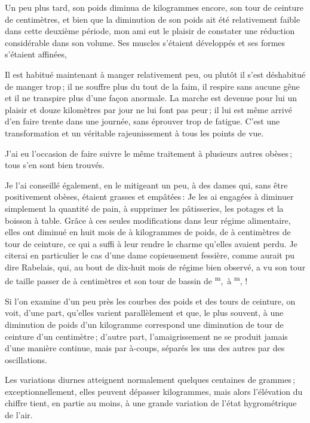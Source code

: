 Un peu plus tard, son poids diminua de {\mmm} kilogrammes encore, son tour
de ceinture de {\mmm} centimètres, et bien que la diminution de son poids
ait été relativement faible dans cette deuxième période, mon ami eut le plaisir
de constater une réduction considérable dans son volume. Ses muscles s'étaient
développés et ses formes s'étaient affinées,

Il est habitué maintenant à manger relativement peu, ou plutôt il s'est
déshabitué de manger trop ; il ne souffre plus du tout de la faim, il respire
sans aucune gêne et il ne transpire plus d'une façon anormale. La marche est
devenue pour lui un plaisir et douze kilomètres par jour ne lui font pas peur ;
il lui est même arrivé d'en faire trente dans une journée, sans éprouver trop
de fatigue. C'est une transformation et un véritable rajeunissement à tous les
points de vue.

J'ai eu l’occasion de faire suivre le même traitement à plusieurs autres obèses ;
tous s'en sont bien trouvés.

Je l'ai conseillé également, en le mitigeant un peu, à des dames qui, sans être
positivement obèses, étaient grasses et empâtées : Je les ai engagées
à diminuer simplement la quantité de pain, à supprimer les pâtisseries, les
potages et la boisson à table. Grâce à ces seules modifications dans leur
régime alimentaire, elles ont diminué en huit mois de {\mmm}
à {\mmm} kilogrammes de poids, de {\mmm} à {\mmm} centimètres
de tour de ceinture, ce qui a suffi à leur rendre le charme qu'elles avaient
perdu. Je citerai en particulier le cas d'une dame copieusement fessière, comme
aurait pu dire Rabelais, qui, au bout de dix-huit mois de régime bien observé,
a vu son tour de taille passer de {\mmm} à {\mmm} centimètres et
son tour de bassin de {\mmm}\textsuperscript{m}, {\mmm}
à {\mmm}\textsuperscript{m}, {\mmm} !

Si l'on examine d'un peu près les courbes des poids et des tours de ceinture,
on voit, d'une part, qu'elles varient parallèlement et que, le plus souvent,
à une diminution de poids d'un kilogramme correspond une diminution de tour de
ceinture d'un centimètre ; d'autre part, l'amaigrissement ne se produit jamais
d'une manière continue, mais par à-coups, séparés les uns des autres par des
oscillations.

Les variations diurnes atteignent normalement quelques centaines de grammes ;
exceptionnellement, elles peuvent dépasser {\mmm} kilogrammes, mais alors
l'élévation du chiffre tient, en partie au moins, à une grande variation de
l’état hygrométrique de l'air.

